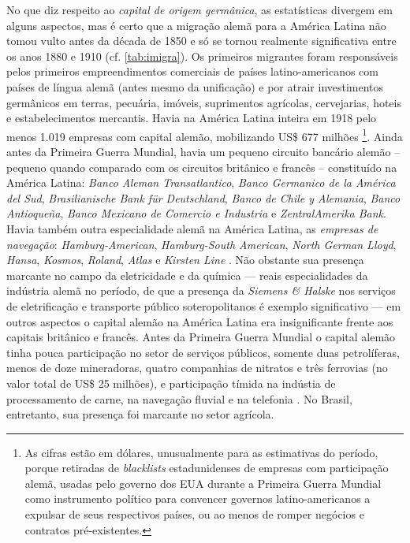 No que diz respeito ao \textit{capital de origem germânica}, as estatísticas divergem em alguns aspectos, mas é certo que a migração alemã para a América Latina não tomou vulto antes da década de 1850 \cite[p.~65]{rippy_german_1948} e só se tornou realmente significativa entre os anos 1880 e 1910 (cf. \autoref{tab:imigra}). Os primeiros migrantes foram responsáveis pelos primeiros empreendimentos comerciais de países latino-americanos com países de língua alemã (antes mesmo da unificação) e por atrair investimentos germânicos em terras, pecuária, imóveis, suprimentos agrícolas, cervejarias, hoteis e estabelecimentos mercantis. Havia na América Latina inteira em 1918 pelo menos 1.019 empresas com capital alemão, mobilizando US\$ 677 milhões \cite[p.~64-65]{rippy_german_1948}\footnote{As cifras estão em dólares, unusualmente para as estimativas do período, porque retiradas de \textit{blacklists} estadunidenses de empresas com participação alemã, usadas pelo governo dos EUA durante a Primeira Guerra Mundial como instrumento político para convencer governos latino-americanos a expulsar de seus respectivos países, ou ao menos de romper negócios e contratos pré-existentes.}. Ainda antes da Primeira Guerra Mundial, havia um pequeno circuito bancário alemão -- pequeno quando comparado com os circuitos britânico e francês -- constituído na América Latina: \textit{Banco Aleman Transatlantico}, \textit{Banco Germanico de la América del Sud}, \textit{Brasilianische Bank für Deutschland}, \textit{Banco de Chile y Alemania}, \textit{Banco Antioqueña}, \textit{Banco Mexicano de Comercio e Industria} e \textit{ZentralAmerika Bank}. Havia também outra especialidade alemã na América Latina, as \textit{empresas de navegação}: \textit{Hamburg-American}, \textit{Hamburg-South American}, \textit{North German Lloyd}, \textit{Hansa}, \textit{Kosmos}, \textit{Roland}, \textit{Atlas} e \textit{Kirsten Line} \cite{rippy_german_1948}. Não obstante sua presença marcante no campo da eletricidade e da química --- reais especialidades da indústria alemã no período, de que a presença da \textit{Siemens \& Halske} nos serviços de eletrificação e transporte público soteropolitanos é exemplo significativo --- em outros aspectos o capital alemão na América Latina era insignificante frente aos capitais britânico e francês. Antes da Primeira Guerra Mundial o capital alemão tinha pouca participação no setor de serviços públicos, somente duas petrolíferas, menos de doze mineradoras, quatro companhias de nitratos e três ferrovias (no valor total de US\$ 25 milhões), e participação tímida na indústia de processamento de carne, na navegação fluvial e na telefonia \cite{rippy_german_1948}. No Brasil, entretanto, sua presença foi marcante no setor agrícola.

